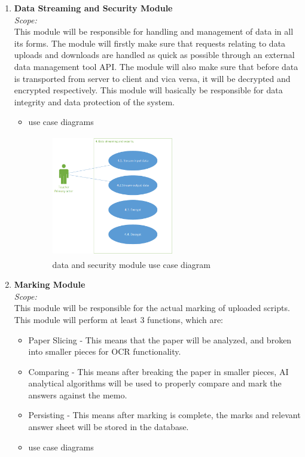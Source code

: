 \documentclass{article}
\begin{document}
\begin{enumerate}
			\item \textbf {Data Streaming and Security Module}\\
					\textit{Scope:}\\
					This module will be responsible for handling and management of data in all its forms. The module will firstly make sure that requests relating to data uploads and downloads are handled as quick as possible through an external data management tool API. The module will also make sure that before data is transported from server to client and vica versa, it will be decrypted and encrypted respectively. This module will basically be responsible for data integrity and data protection of the system.  \\
			\begin{itemize}
								\item use case diagrams\\
								\begin{figure}[h]

								\centerline{\includegraphics[width=200px, height=200px, inner]{data_and_security.png}}
								\caption{data and security module use case diagram}
								\end{figure}
					\end{itemize}
			
			\item \textbf{Marking Module}\\
				\textit{Scope:}\\
				This module will be responsible for the actual marking of uploaded scripts. This module will perform at least 3 functions, which are:
				\begin{itemize}
					\item Paper Slicing - This means that the paper will be analyzed, and broken into smaller pieces for OCR functionality.
					\item Comparing - This means after breaking the paper in smaller pieces, AI analytical algorithms will be used to properly compare and mark the answers against the memo.
					\item Persisting - This means after marking is complete, the marks and relevant answer sheet will be stored in the database.
				\end{itemize}
\begin{itemize}
								\item use case diagrams\\
								\begin{figure}[h]


\end{figure}
\end{itemize}
\end{enumerate}
\end{document}
